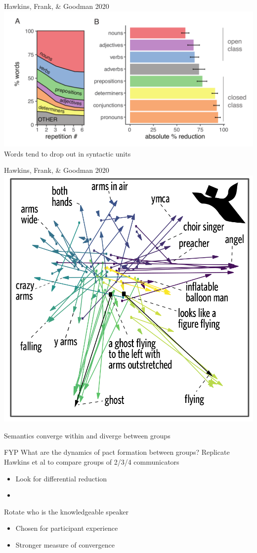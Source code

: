 \documentclass[ 12pt, xcolor=beamer,table,usenames,dvipsnames, ignorenonframetext, ngerman]{beamer}
\begin{document}
%
\begin{frame}{Hawkins, Frank, \& Goodman 2020}
\includegraphics[width=\textwidth]{../images/hawkins_pos.png}
Words tend to drop out in syntactic units
\end{frame}

\begin{frame}{Hawkins, Frank, \& Goodman 2020}
	\includegraphics[width=.6\textwidth]{../images/hawkins_semantics.png}
	
	Semantics converge within and diverge between groups
\end{frame}

%
\begin{frame}{FYP}
	What are the dynamics of pact formation between groups? \pause
	 Replicate Hawkins et al to compare groups of 2/3/4 communicators
	\begin{itemize}
		\item Look for differential reduction
		\item 
	\end{itemize} 
Rotate who is the knowledgeable speaker
\begin{itemize}
	\item Chosen for participant experience
	\item Stronger measure of convergence
\end{itemize}

\end{frame}
\end{document}

